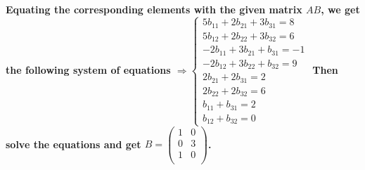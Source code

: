\paragraph{Equating the corresponding elements with the given matrix \( AB \), we get the following system of equations $ \Rightarrow \left\{
        \begin{matrix}
            5b_{11} + 2b_{21} + 3b_{31} = 8  \\
            5b_{12} + 2b_{22} + 3b_{32} = 6  \\
            -2b_{11} + 3b_{21} + b_{31} = -1 \\
            -2b_{12} + 3b_{22} + b_{32} = 9  \\
            2b_{21} + 2b_{31} = 2            \\
            2b_{22} + 2b_{32} = 6            \\
            b_{11} + b_{31} = 2              \\
            b_{12} + b_{32} = 0
        \end{matrix}
        \right.$
    Then solve the equations and get
    $ B = \left(
        \begin{matrix}
            1 & 0 \\
            0 & 3 \\
            1 & 0 \\
        \end{matrix}
        \right) $.}
% 
% 
% 
% 
% 
% 
% 
% 
% 
